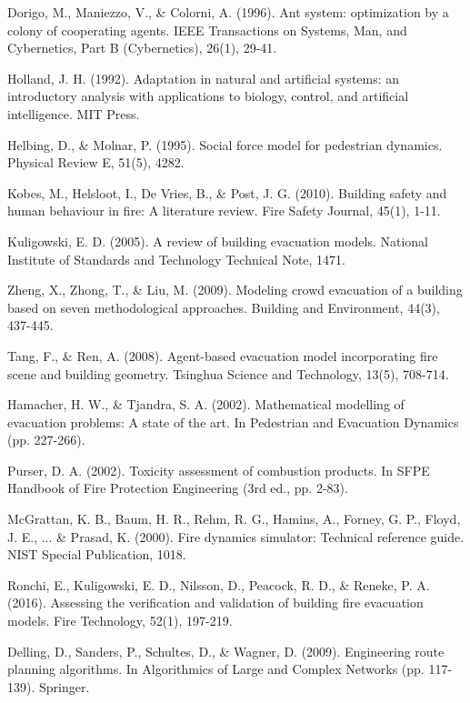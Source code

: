 \documentclass[11pt,a4paper]{report}
\begin{document}
\begin{thebibliography}{99}
 Dorigo, M., Maniezzo, V., \& Colorni, A. (1996). Ant system: optimization by a colony of cooperating agents. IEEE Transactions on Systems, Man, and Cybernetics, Part B (Cybernetics), 26(1), 29-41.

 Holland, J. H. (1992). Adaptation in natural and artificial systems: an introductory analysis with applications to biology, control, and artificial intelligence. MIT Press.

 Helbing, D., \& Molnar, P. (1995). Social force model for pedestrian dynamics. Physical Review E, 51(5), 4282.

 Kobes, M., Helsloot, I., De Vries, B., \& Post, J. G. (2010). Building safety and human behaviour in fire: A literature review. Fire Safety Journal, 45(1), 1-11.

 Kuligowski, E. D. (2005). A review of building evacuation models. National Institute of Standards and Technology Technical Note, 1471.

 Zheng, X., Zhong, T., \& Liu, M. (2009). Modeling crowd evacuation of a building based on seven methodological approaches. Building and Environment, 44(3), 437-445.

 Tang, F., \& Ren, A. (2008). Agent-based evacuation model incorporating fire scene and building geometry. Tsinghua Science and Technology, 13(5), 708-714.

 Hamacher, H. W., \& Tjandra, S. A. (2002). Mathematical modelling of evacuation problems: A state of the art. In Pedestrian and Evacuation Dynamics (pp. 227-266).

 Purser, D. A. (2002). Toxicity assessment of combustion products. In SFPE Handbook of Fire Protection Engineering (3rd ed., pp. 2-83).

 McGrattan, K. B., Baum, H. R., Rehm, R. G., Hamins, A., Forney, G. P., Floyd, J. E., ... \& Prasad, K. (2000). Fire dynamics simulator: Technical reference guide. NIST Special Publication, 1018.

 Ronchi, E., Kuligowski, E. D., Nilsson, D., Peacock, R. D., \& Reneke, P. A. (2016). Assessing the verification and validation of building fire evacuation models. Fire Technology, 52(1), 197-219.

 Delling, D., Sanders, P., Schultes, D., \& Wagner, D. (2009). Engineering route planning algorithms. In Algorithmics of Large and Complex Networks (pp. 117-139). Springer.


\end{thebibliography}
\end{document}
